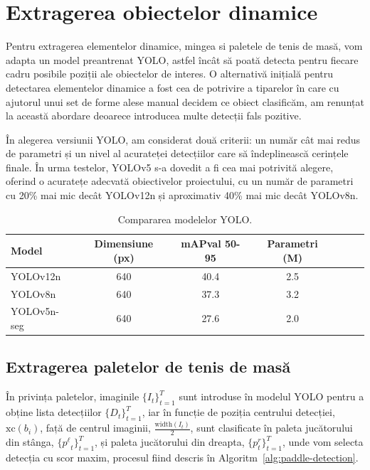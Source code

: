 \section{Extragerea obiectelor dinamice}
\label{subsec:dynamic-objects}
Pentru extragerea elementelor dinamice, mingea si paletele de tenis de masă, vom adapta un model preantrenat YOLO, astfel încât să poată detecta pentru fiecare cadru posibile poziții ale obiectelor de interes. O alternativă inițială pentru detectarea elementelor dinamice a fost cea de potrivire a tiparelor în care cu ajutorul unui set de forme alese manual decidem ce obiect clasificăm, am renunțat la această abordare deoarece introducea multe detecții fals pozitive.

În alegerea versiunii YOLO, am considerat două criterii: un număr cât mai redus de parametri și un nivel al acurateței detecțiilor care să îndeplinească cerințele finale. În urma testelor, YOLOv5 s-a dovedit a fi cea mai potrivită alegere, oferind o acuratețe adecvată obiectivelor proiectului, cu un număr de parametri cu 20\% mai mic decât YOLOv12n și aproximativ 40\% mai mic decât YOLOv8n.

\begin{table}[h]
    \centering
    \begin{tabular}{lcccccc}
        \toprule
        Model & Dimensiune (px) & mAPval 50-95 & Parametri (M) \\
        \midrule
        YOLOv12n \cite{yolov12} & 640 & 40.4 & 2.5 \\
        YOLOv8n \cite{yolov8} & 640 & 37.3 & 3.2 \\
        YOLOv5n-seg \cite{yolov5} & 640 & 27.6 & 2.0 \\
    \end{tabular}
    \caption{Compararea modelelor YOLO.}
    \label{tab:yolo_comparison}
\end{table}

\subsection{Extragerea paletelor de tenis de masă}
\label{subsec:paddle-detect}
În privința paletelor, imaginile $\{I_t\}_{t=1}^{T}$ sunt introduse în modelul YOLO pentru a obține lista detecțiilor $\{D_t\}_{t=1}^T$, iar în funcție de poziția centrului detecției, $\mathrm{xc}(b_i)$, față de centrul imaginii, $\tfrac{\mathrm{width}(I_t)}{2}$, sunt clasificate în paleta jucătorului din stânga, $\{{p^\ell}_t\}_{t=1}^T$, și paleta jucătorului din dreapta, $\{p^{r}_t\}_{t=1}^T$, unde vom selecta detecția cu scor maxim, procesul fiind descris în Algoritm~\ref{alg:paddle-detection}.

